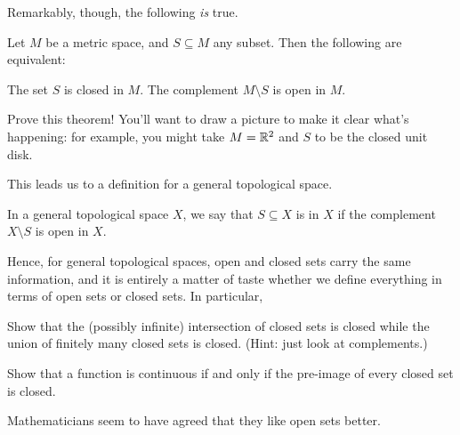 Remarkably, though, the following \emph{is} true.
\begin{theorem}
	Let $M$ be a metric space, and $S \subseteq M$ any subset.
	Then the following are equivalent:
	\begin{itemize}
		\ii The set $S$ is closed in $M$.
		\ii The complement $M \setminus S$ is open in $M$.
	\end{itemize}
\end{theorem}
\begin{exercise}
	Prove this theorem!
	You'll want to draw a picture to make it clear what's happening: for example,
	you might take $M = \mathbb R^2$ and $S$ to be the closed unit disk.
\end{exercise}

This leads us to a definition for a general topological space.
\begin{definition}
	In a general topological space $X$, we say that $S \subseteq X$ is
	 in $X$ if the complement $X \setminus S$ is open in $X$.
\end{definition}
Hence, for general topological spaces, open and closed sets carry the same information,
and it is entirely a matter of taste whether we define everything in terms
of open sets or closed sets.
In particular,
\begin{ques}
	Show that the (possibly infinite) intersection of closed sets is closed
	while the union of finitely many closed sets is closed.
	(Hint: just look at complements.)
\end{ques}
\begin{ques}
	Show that a function is continuous if and only if the pre-image
	of every closed set is closed.
\end{ques}
Mathematicians seem to have agreed that they like open sets better.

